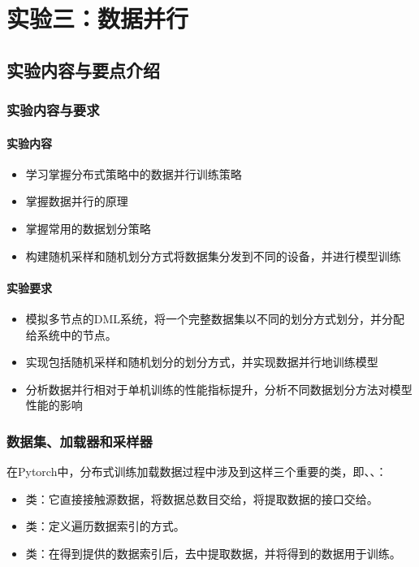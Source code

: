 \chapter{实验三：数据并行}

\section{实验内容与要点介绍}

\subsection{实验内容与要求}

\subsubsection{实验内容}
\begin{itemize}
    \item 学习掌握分布式策略中的数据并行训练策略
    \item 掌握数据并行的原理
    \item 掌握常用的数据划分策略
    \item 构建随机采样和随机划分方式将数据集分发到不同的设备，并进行模型训练
\end{itemize}


\subsubsection{实验要求}
\begin{itemize}
    \item 模拟多节点的DML系统，将一个完整数据集以不同的划分方式划分，并分配给系统中的节点。
    \item 实现包括随机采样和随机划分的划分方式，并实现数据并行地训练模型
    \item 分析数据并行相对于单机训练的性能指标提升，分析不同数据划分方法对模型性能的影响
\end{itemize}


\subsection{数据集、加载器和采样器}

在Pytorch中，分布式训练加载数据过程中涉及到这样三个重要的类，即、、：
\begin{itemize}
    \item {}类：它直接接触源数据，将数据总数目交给，将提取数据的接口交给。
    \item {}类：定义遍历数据索引的方式。
    \item {}类：在得到提供的数据索引后，去中提取数据，并将得到的数据用于训练。
\end{itemize}

